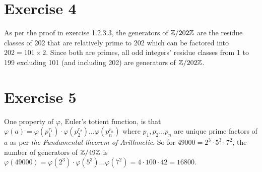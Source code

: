 \documentclass[12pt]{article}
\begin{document}
    \section*{Exercise 4}
    As per the proof in exercise 1.2.3.3,
    the generators of $\mathbb{Z}/202\mathbb{Z}$ are the residue classes of 202
    that are relatively prime to 202
    which can be factored into $202 = 101 \times 2$.
    Since both are primes, all odd integers' residue classes
    from 1 to 199 excluding 101 (and including 202) are generators
    of $\mathbb{Z}/202\mathbb{Z}$.


    \section*{Exercise 5}
    One property of $\varphi$, Euler's totient function,
    is that $\varphi(a)
    = \varphi(p_1^{r_1}) \cdot \varphi(p_2^{r_2}) \dots \varphi(p_n^{r_n})$
    where $p_1, p_2 \dots p_n$ are unique prime factors of $a$
    as per \textit{the Fundamental theorem of Arithmetic}.
    So for $49000 = 2^3 \cdot 5^3 \cdot 7^2$,
    the number of generators of $\mathbb{Z}/49\mathbb{Z}$
    is $\varphi(49000) = \varphi(2^3) \cdot \varphi(5^3) \dots \varphi(7^2)
    = 4 \cdot 100 \cdot 42 = 16800$.
\end{document}

